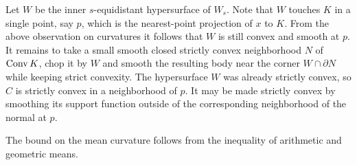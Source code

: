 \documentclass[a4paper,10pt]{article}
\begin{document}
Let $W$ be the inner $s$-equidistant hypersurface of $W_s$.
Note that $W$ touches $K$ in a single point, say $p$, which is the nearest-point projection of $x$ to $K$.
From the above observation on curvatures it follows that $W$ is still convex and smooth at $p$.
It remains to take a small smooth closed strictly convex neighborhood $N$ of $\mathop{\rm Conv} K$, chop it by $W$ and smooth the resulting body near the corner $W\cap \partial N$ while keeping strict convexity.
The hypersurface $W$ was already strictly convex, so $C$ is strictly convex in a neighborhood of $p$.
It may be made strictly convex by smoothing its support function outside of the corresponding neighborhood of the normal at $p$.

The bound on the mean curvature follows from the inequality of arithmetic and geometric means.
\qeds
\end{document}
